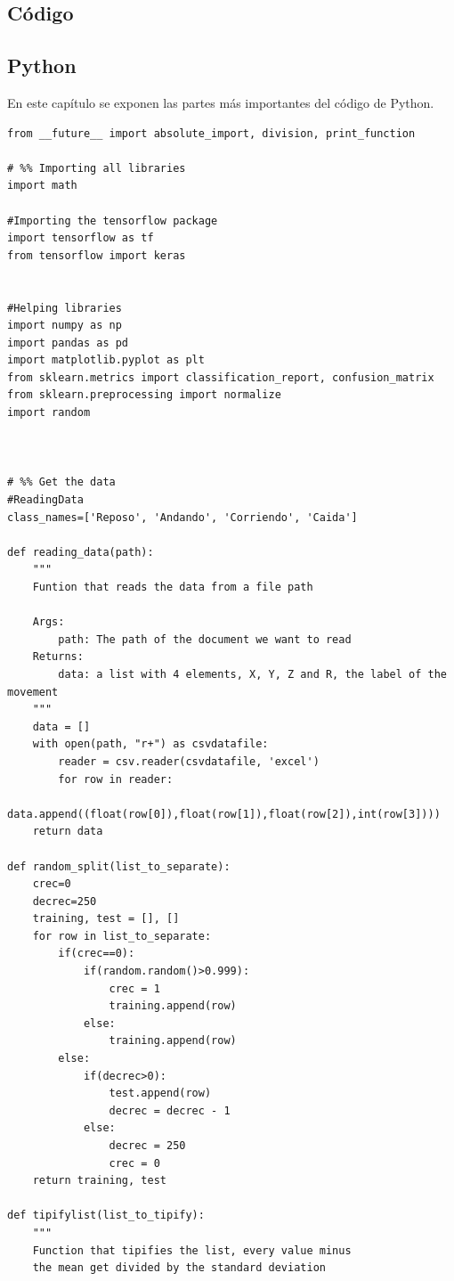 \documentclass[12pt]{book}
\numberwithin{equation}{section}
\begin{document}
\newpage
\begin{appendices}
\chapter{Código}

\section{Python}

En este capítulo se exponen las partes más importantes del código de Python. 
\begin{verbatim}
from __future__ import absolute_import, division, print_function

# %% Importing all libraries
import math

#Importing the tensorflow package
import tensorflow as tf
from tensorflow import keras


#Helping libraries
import numpy as np
import pandas as pd
import matplotlib.pyplot as plt
from sklearn.metrics import classification_report, confusion_matrix
from sklearn.preprocessing import normalize
import random



# %% Get the data
#ReadingData
class_names=['Reposo', 'Andando', 'Corriendo', 'Caida']

def reading_data(path):
    """ 
    Funtion that reads the data from a file path
    
    Args:
        path: The path of the document we want to read
    Returns:
        data: a list with 4 elements, X, Y, Z and R, the label of the movement
    """
    data = []
    with open(path, "r+") as csvdatafile:
        reader = csv.reader(csvdatafile, 'excel')
        for row in reader:
            data.append((float(row[0]),float(row[1]),float(row[2]),int(row[3])))
    return data

def random_split(list_to_separate):
    crec=0
    decrec=250
    training, test = [], []
    for row in list_to_separate:
        if(crec==0):
            if(random.random()>0.999):
                crec = 1
                training.append(row)
            else:
                training.append(row)
        else:
            if(decrec>0):
                test.append(row)
                decrec = decrec - 1
            else:
                decrec = 250
                crec = 0
    return training, test
	
def tipifylist(list_to_tipify):
	"""
	Function that tipifies the list, every value minus 
	the mean get divided by the standard deviation
	

\end{verbatim}
\end{appendices}
\end{document}
